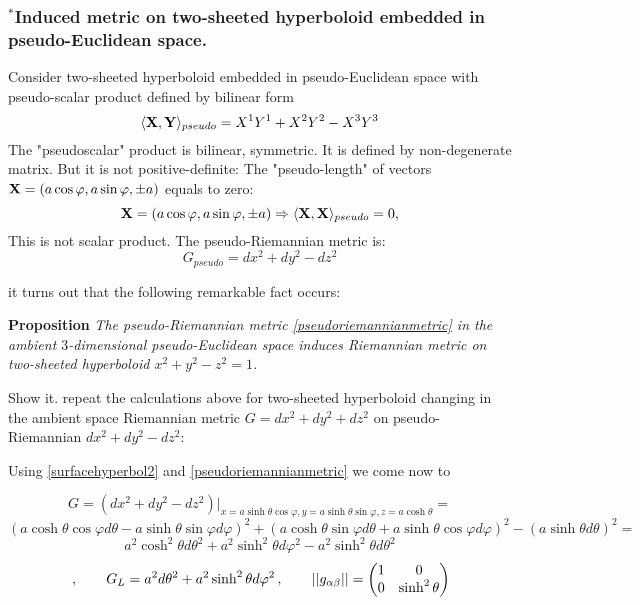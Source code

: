\documentclass[12pt]{article}
\theoremstyle{theorem}
\numberwithin{equation}{section}
\begin{document}
  \subsubsection {$^*$Induced metric on two-sheeted hyperboloid embedded in pseudo-Euclidean space.}

{\small
   Consider two-sheeted hyperboloid embedded in pseudo-Euclidean space with pseudo-scalar product defined by
   bilinear form
   \begin{equation}\label{pseudoscalar produc}
    \langle{\bf X},{\bf Y}\rangle_{pseudo}= X^1Y^1+X^2Y^2-X^3Y^3
   \end{equation}
 The "pseudoscalar" product is bilinear, symmetric. It is defined by non-degenerate matrix.
  But it is not positive-definite: The "pseudo-length" of vectors ${\bf X}=(a\cos\varphi,a\sin\varphi,\pm a)$ equals to zero:
       \begin{equation}\label{pseudolength}
     {\bf X}=(a\cos\varphi,a\sin\varphi,\pm a)\Rightarrow   \langle{\bf X},{\bf X}\rangle_{pseudo}=0,
       \end{equation}
This is not scalar product. The pseudo-Riemannian metric is:
              \begin{equation}\label{pseudoriemannianmetric}
                G_{pseudo}=dx^2+dy^2-dz^2
              \end{equation}



it turns out that the  following remarkable fact occurs:

 {\bf Proposition} {\it The pseudo-Riemannian metric \eqref{pseudoriemannianmetric} in the ambient $3$-dimensional
 pseudo-Euclidean space induces Riemannian metric on two-sheeted hyperboloid $x^2+y^2-z^2=1$.}

 Show it.  repeat the calculations above for two-sheeted hyperboloid changing in the ambient space
 Riemannian metric $G=dx^2+dy^2+dz^2$ on pseudo-Riemannian $dx^2+dy^2-dz^2$:

\m


Using \eqref{surfacehyperbol2} and  \eqref{pseudoriemannianmetric}
we come now to


              $$
              G=
              \left(dx^2+dy^2-dz^2\right)\big\vert_{x=a\sinh\theta\cos\varphi,y=a\sinh\theta\sin\varphi,
              z=a\cosh\theta}=
                      $$
                      $$
                      (a\cosh\theta\cos\varphi d\theta-a\sinh\theta\sin\varphi d\varphi)^2+
                      (a\cosh\theta\sin\varphi d\theta+a\sinh\theta\cos\varphi d\varphi)^2-
                         (a\sinh\theta d\theta)^2=
                      $$
                      $$
          a^2\cosh^2\theta d\theta^2+a^2\sinh^2\theta d\varphi^2-a^2\sinh^2\theta d\theta^2
                      $$
        \begin{equation}\label{firtsquadraticformforsphere(diff)}\,,\qquad
           G_L  =a^2d\theta^2+a^2\sinh^2\theta d\varphi^2\,,\qquad
                        ||g_{\alpha\beta}||=
   \begin{pmatrix}
   1 & 0 \\
   0&  \sinh^2\theta \\
   \end{pmatrix}
\end{equation}


}
\end{document}
